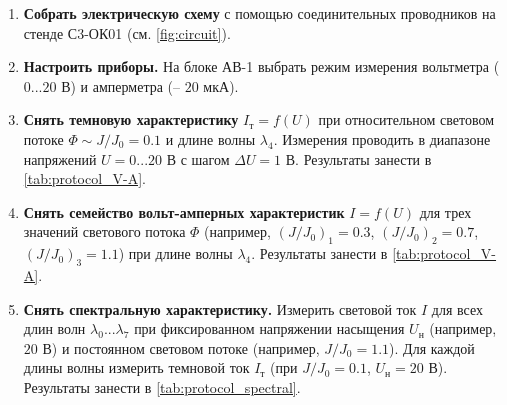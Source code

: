 \begin{enumerate}
    \item \textbf{Собрать электрическую схему} с помощью соединительных проводников на стенде С3-ОК01 (см. \cref{fig:circuit}).

    \item \textbf{Настроить приборы.} На блоке АВ-1 выбрать режим измерения вольтметра ($0...20$ В) и амперметра (– $20$ мкА).

    \item \textbf{Снять темновую характеристику} $I_\text{т} = f(U)$ при относительном световом потоке $\Phi \sim J/J_0 = 0.1$ и длине волны $\lambda_4$. Измерения проводить в диапазоне напряжений $U = 0...20$ В с шагом $\Delta U = 1$ В. Результаты занести в \cref{tab:protocol_V-A}.

    \item \textbf{Снять семейство вольт-амперных характеристик} $I=f(U)$ для трех значений светового потока $\Phi$ (например, $(J/J_0)_1=0.3$, $(J/J_0)_2=0.7$, $(J/J_0)_3=1.1$) при длине волны $\lambda_4$. Результаты занести в \cref{tab:protocol_V-A}.

    \item \textbf{Снять спектральную характеристику.} Измерить световой ток $I$ для всех длин волн $\lambda_0 ... \lambda_7$ при фиксированном напряжении насыщения $U_\text{н}$ (например, $20$ В) и постоянном световом потоке (например, $J/J_0=1.1$). Для каждой длины волны измерить темновой ток $I_\text{т}$ (при $J/J_0=0.1$, $U_\text{н}=20$ В). Результаты занести в \cref{tab:protocol_spectral}.
\end{enumerate}

\newpage
\thispagestyle{empty}

